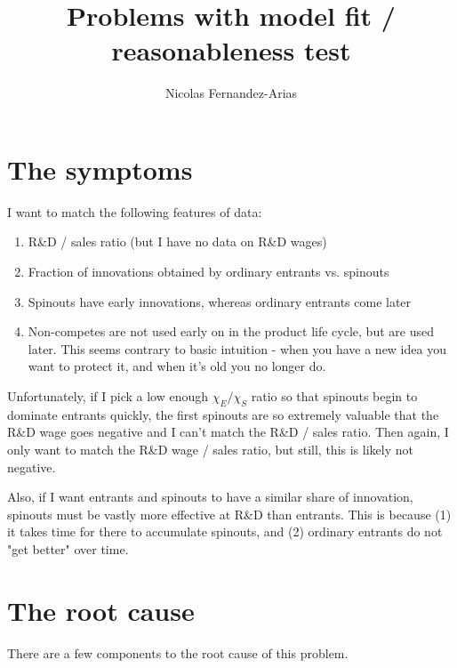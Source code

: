 \documentclass[12pt,english]{article}
\theoremstyle{remark}
\begin{document}
	
\title{Problems with model fit / reasonableness test}
\author{Nicolas Fernandez-Arias}
\maketitle

\section{The symptoms}

I want to match the following features of data:

\begin{enumerate}
	\item R\&D / sales ratio (but I have no data on R\&D wages)
	\item Fraction of innovations obtained by ordinary entrants vs. spinouts
	\item Spinouts have early innovations, whereas ordinary entrants come later
	\item Non-competes are not used early on in the product life cycle, but are used later. This seems contrary to basic intuition - when you have a new idea you want to protect it, and when it's old you no longer do. 
\end{enumerate}

Unfortunately, if I pick a low enough $\chi_E / \chi_S$ ratio so that spinouts begin to dominate entrants quickly, the first spinouts are so extremely valuable that the R\&D wage goes negative and I can't match the R\&D / sales ratio. Then again, I only want to match the R\&D wage / sales ratio, but still, this is likely not negative. 

Also, if I want entrants and spinouts to have a similar share of innovation, spinouts must be vastly more effective at R\&D than entrants. This is because (1) it takes time for there to accumulate spinouts, and (2) ordinary entrants do not "get better" over time. 

\section{The root cause}

There are a few components to the root cause of this problem. 
\end{document}
